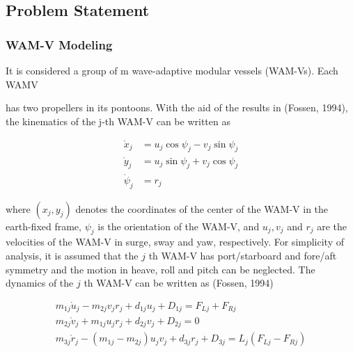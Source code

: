 \documentclass[10pt]{article}
\begin{document}
\subsection{Problem Statement}
\subsubsection{WAM-V Modeling}
It is considered a group of m wave-adaptive modular vessels (WAM-Vs). Each WAMV

has two propellers in its pontoons. With the aid of the results in (Fossen, 1994), the kinematics of the $\mathrm{j}$-th WAM-V can be written as

$$
\begin{aligned}
\grave{x}_{j} & =u_{j} \cos \psi_{j}-v_{j} \sin \psi_{j} \\
\grave{y}_{j} & =u_{j} \sin \psi_{j}+v_{j} \cos \psi_{j} \\
\grave{\psi}_{j} & =r_{j}
\end{aligned}
$$

where $\left(x_{j}, y_{j}\right)$ denotes the coordinates of the center of the WAM-V in the earth-fixed frame, $\psi_{j}$ is the orientation of the WAM-V, and $u_{j}, v_{j}$ and $r_{j}$ are the velocities of the WAM-V in surge, sway and yaw, respectively. For simplicity of analysis, it is assumed that the $j$ th WAM-V has port/starboard and fore/aft symmetry and the motion in heave, roll and pitch can be neglected. The dynamics of the $j$ th WAM-V can be written as (Fossen, 1994)

$$
\begin{gathered}
m_{1 j} \grave{u}_{j}-m_{2 j} v_{j} r_{j}+d_{1 j} u_{j}+D_{1 j}=F_{L j}+F_{R j} \\
m_{2 j} \grave{v}_{j}+m_{1 j} u_{j} r_{j}+d_{2 j} v_{j}+D_{2 j}=0 \\
m_{3 j} \grave{r}_{j}-\left(m_{1 j}-m_{2 j}\right) u_{j} v_{j}+d_{3 j} r_{j}+D_{3 j}=L_{j}\left(F_{L j}-F_{R j}\right)
\end{gathered}
$$
\end{document}
